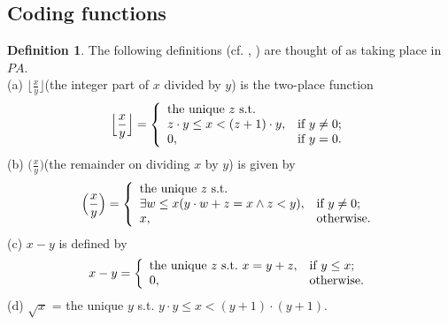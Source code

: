 \documentclass[a4paper,11pt]{article}
\begin{document}
\subsection{Coding functions}

\theoremstyle{definition}
\newtheorem{basic_functions}{Definition}[subsection]
\begin{basic_functions} \label{basic_functions}
The following definitions (cf. \cite[p54]{model_1}, \cite[p42]{computability_1}) are thought of as taking place in $PA$.\\
(a) $\Big \lfloor \frac{x}{y} \Big \rfloor$(the integer part of $x$ divided by $y$) is the two-place function
\begin{displaymath}
\Big\lfloor \frac{x}{y} \Big\rfloor = \left\{
                                \begin{array}{ll}
                                  \mbox{the unique $z$ s.t.} \\
                                  z\cdot y\leq x < (z+1)\cdot y, & \hbox{if $y\neq 0$;} \\
                                  0, & \hbox{if $y=0$.}
                                \end{array}
                              \right.
\end{displaymath}
(b) $\Big( \frac{x}{y} \Big)$(the remainder on dividing $x$ by $y$) is given by
\begin{displaymath}
 \Big( \frac{x}{y} \Big) = \left\{
                             \begin{array}{ll}
                               \mbox{the unique $z$ s.t.} \\
                               \exists w\leq x(y\cdot w+z=x\wedge z< y), & \hbox{if $y\neq 0$;} \\
                               x, & \hbox{otherwise.}
                             \end{array}
                           \right.
\end{displaymath}
(c) $x-y$ is defined by
\begin{displaymath}
x-y = \left\{
        \begin{array}{ll}
          \mbox{the unique $z$ s.t.\ } x=y+z, & \hbox{if $y\leq x$;} \\
          0, & \hbox{otherwise.}
        \end{array}
      \right.
\end{displaymath}
(d) $\sqrt{x}$ = the unique $y$ s.t. $y\cdot y \leq x < (y+1)\cdot (y+1)$.
\end{basic_functions}
\end{document}
